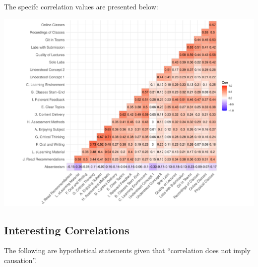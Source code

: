 \documentclass[
]{article}
\begin{document}
\newpage

The specifc correlation values are presented below:

\includegraphics{AnalysisOfCourseEvaluation-Notebook_files/figure-latex/CorrelationMatrixWithFigures-1.pdf}

\subsection{Interesting Correlations}\label{interesting-correlations}

The following are hypothetical statements given that ``correlation does
not imply causation''.
\end{document}
